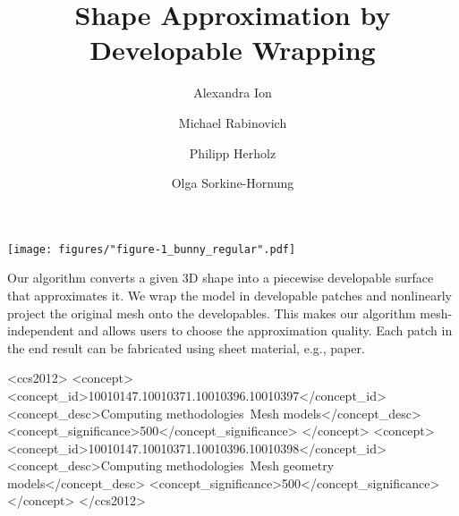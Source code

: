 \documentclass[acmtog]{acmart}
\begin{document}
\title[Shape Approximation by Developable Wrapping]{Shape Approximation by Developable Wrapping}

\author{Alexandra Ion}
\author{Michael Rabinovich}
\author{Philipp Herholz}
\author{Olga Sorkine-Hornung}
\renewcommand{\shortauthors}{Ion, Rabinovich, Herholz, Sorkine-Hornung}

\begin{teaserfigure}
  \centering
  \texttt{[image: figures/"figure-1\_bunny\_regular".pdf]}
  \caption{
    Our algorithm converts a given 3D shape into a piecewise developable surface that approximates it. We wrap the model in developable patches and nonlinearly project the original mesh onto the developables. This makes our algorithm mesh-independent and allows users to choose the approximation quality. Each patch in the end result can be fabricated using sheet material, e.g., paper. 
  \label{fig:1-teaser}}
\end{teaserfigure}

\begin{abstract}
  
\end{abstract}

\begin{CCSXML}
<ccs2012>
<concept>
<concept_id>10010147.10010371.10010396.10010397</concept_id>
<concept_desc>Computing methodologies~Mesh models</concept_desc>
<concept_significance>500</concept_significance>
</concept>
<concept>
<concept_id>10010147.10010371.10010396.10010398</concept_id>
<concept_desc>Computing methodologies~Mesh geometry models</concept_desc>
<concept_significance>500</concept_significance>
</concept>
</ccs2012>
\end{CCSXML}


\end{document}
